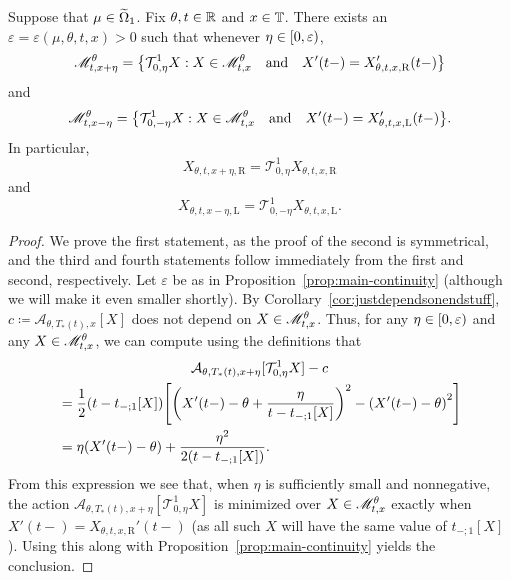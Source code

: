 \documentclass[AHL,Unicode,longabstracts]{cedram}
\newcommand*\scM{\mathscr{M}}
\newcommand*\TT{\mathbb{T}}
\newcommand*\RR{\mathbb{R}}
\newcommand{\clA}{\mathcal{A}}
\newcommand{\clT}{\mathcal{T}}
\newcommand*\st{\mathrel{:}}
\newcommand*\Left{\mathrm{L}}
\newcommand*\Right{\mathrm{R}}
\newcommand*\eps{\varepsilon}
\let\oldin\in
\renewcommand{\in}{\mathchoice{\oldin}{\oldin}{\,\oldin\,}{\,\oldin\,}}
\let\originalleft\left
\let\originalright\right
\renewcommand{\left}{\mathopen{}\mathclose\bgroup\originalleft}
\renewcommand{\right}{\aftergroup\egroup\originalright}
\newcommand*\TT{\mathbb{T}}
\newcommand*\RR{\mathbb{R}}
\begin{document}
\begin{coro}\label{cor:minimizers-movex}
Suppose that $\mu\in\widetilde{\Omega}_{1}$. Fix $\theta,t\in\RR$ and $x\in\TT$. There exists an $\eps=\eps(\mu,\theta,t,x)>0$ such that whenever $\eta\in[0,\eps)$,
\begin{equation}\label{eq:Mx+eta}
\scM_{t,x+\eta}^{\theta}=
\left\{\clT_{0,\eta}^{1}X\st X\in\scM_{t,x}^{\theta}\quad\text{and}\quad X'(t-)=X_{\theta,t,x,\Right}'(t-)\right\}
\end{equation}
and
\begin{equation}\label{eq:Mx-eta}
\scM_{t,x-\eta}^{\theta}=
\left\{\clT_{0,-\eta}^{1}X\st X\in\scM_{t,x}^{\theta}\quad\text{and}\quad X'(t-)=X_{\theta,t,x,\Left}'(t-)\right\}.
\end{equation}
In particular,
\begin{equation}\label{eq:Xx+eta}
X_{\theta,t,x+\eta,\Right}=\clT_{0,\eta}^{1}X_{\theta,t,x,\Right}
\end{equation}
and
\begin{equation}\label{eq:Xx-eta}
X_{\theta,t,x-\eta,\Left}=\clT_{0,-\eta}^{1}X_{\theta,t,x,\Left}.
\end{equation}
\end{coro}

\begin{proof}
We prove the first statement, as the proof of the second is symmetrical, and the third and fourth statements follow immediately from the first and second, respectively. Let $\eps$ be as in Proposition~\ref{prop:main-continuity} (although we will make it even smaller shortly). By Corollary~\ref{cor:justdependsonendstuff}, $c\coloneqq\clA_{\theta,T_{*}(t),x}[X]$ does not depend on $X\in\scM_{t,x}^{\theta}$. Thus, for any $\eta\in[0,\eps)$ and any $X\in\scM_{t,x}^{\theta}$, we can compute using the definitions that
\begin{multline*}
\clA_{\theta,T_{*}(t),x+\eta}[\clT_{0,\eta}^{1}X]-c \\
\begin{aligned}
& =\frac{1}{2}(t-t_{-;1}[X])\left[\left(X'(t-)-\theta+\frac{\eta}{t-t_{-;1}[X]}\right)^{2}-\left(X'(t-)-\theta\right)^{2}\right]\\
& =\eta(X'(t-)-\theta)+\frac{\eta^{2}}{2(t-t_{-;1}[X])}.
\end{aligned}
\end{multline*}
From this expression we see that, when $\eta$ is sufficiently small and nonnegative, the action $\clA_{\theta,T_{*}(t),x+\eta}[\clT_{0,\eta}^{1}X]$ is minimized over $X\in\scM_{t,x}^{\theta}$ exactly when $X'(t-)=X_{\theta,t,x,\Right}'(t-)$ (as all such $X$ will have the same value of $t_{-;1}[X]$). Using this along with Proposition~\ref{prop:main-continuity} yields the conclusion.
\end{proof}
\end{document}

